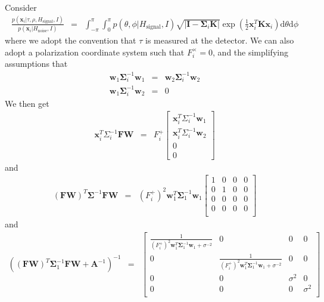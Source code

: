\documentclass{article}
\begin{document}
Consider
\begin{eqnarray}
\frac{p(\mathbf{x}_i|\tau,\rho,H_\textrm{signal},I)}{p(\mathbf{x}_i|H_\textrm{noise},I)}&=&
\int_{-\pi}^\pi\int_0^\pi
p(\theta,\phi|H_\textrm{signal},I)
\sqrt{|\mathbf{I}-\mathbf{\Sigma}_i\mathbf{K}|}
\exp(\frac{1}{2}\mathbf{x}_i^T\mathbf{K}\mathbf{x}_i)
\mathrm{d}\theta\mathrm{d}\phi\nonumber
\end{eqnarray}
where we adopt the convention that $\tau$ is measured at the detector.  We can also adopt a polarization coordinate system such that $F_i^\times=0$, and the simplifying assumptions that
\begin{eqnarray}
\mathbf{w}_1\mathbf{\Sigma}^{-1}_i\mathbf{w}_1&=&\mathbf{w}_2\mathbf{\Sigma}^{-1}_i\mathbf{w}_2\\
\mathbf{w}_1\mathbf{\Sigma}^{-1}_i\mathbf{w}_2&=&0
\end{eqnarray}
We then get
\begin{eqnarray}
\mathbf{x}^T_i{\Sigma}^{-1}_i\mathbf{FW}&=&F_i^+\left[
\begin{array}{c}
\mathbf{x}^T_i{\Sigma}^{-1}_i\mathbf{w}_1 \\
\mathbf{x}^T_i{\Sigma}^{-1}_i\mathbf{w}_2 \\
0 \\
0
\end{array}
\right]
\end{eqnarray}
and
\begin{eqnarray}
(\mathbf{FW})^T\mathbf{\Sigma}^{-1}\mathbf{FW}&=&
(F_i^+)^2\mathbf{w}_1^T\mathbf{\Sigma}^{-1}_1\mathbf{w}_1
\left[
\begin{array}{cccc}
1 & 0 & 0 & 0 \\
0 & 1 & 0 & 0 \\
0 & 0 & 0 & 0 \\
0 & 0 & 0 & 0 \\
\end{array}
\right]
\end{eqnarray}
and
\begin{eqnarray}
((\mathbf{FW})^T\mathbf{\Sigma}_1^{-1}\mathbf{FW}+\mathbf{A}^{-1})^{-1}&=&
\left[
\begin{array}{cccc}
\frac{1}{(F_i^+)^2\mathbf{w}_1^T\mathbf{\Sigma}^{-1}_1\mathbf{w}_1 + \sigma^{-2}} & 0 & 0 & 0 \\
0 & \frac{1}{(F_i^+)^2\mathbf{w}_1^T\mathbf{\Sigma}^{-1}_1\mathbf{w}_1 + \sigma^{-2}} & 0 & 0 \\
0 & 0 & \sigma^2 & 0 \\
0 & 0 & 0 & \sigma^2 \\
\end{array}
\right]
\end{eqnarray}
\end{document}

